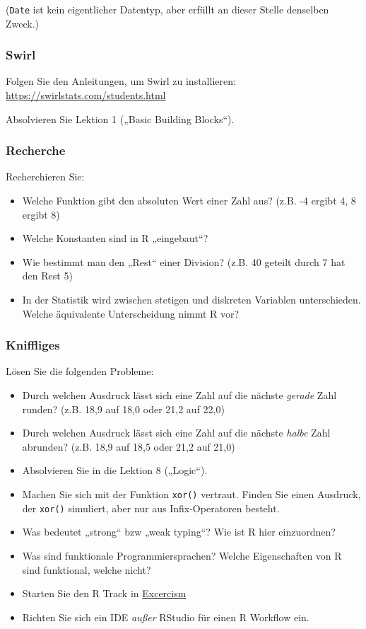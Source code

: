 \documentclass[11pt,german,a4paper]{article}
\providecommand{\tightlist}{%
  \setlength{\itemsep}{0pt}\setlength{\parskip}{0pt}}
\begin{document}
(\texttt{Date} ist kein eigentlicher Datentyp, aber erfüllt an dieser Stelle denselben Zweck.)

\hypertarget{swirl}{%
\subsubsection{Swirl}\label{swirl}}

Folgen Sie den Anleitungen, um Swirl zu installieren: \url{https://swirlstats.com/students.html}

Absolvieren Sie Lektion 1 („Basic Building Blocks``).

\hypertarget{recherche}{%
\subsubsection{Recherche}\label{recherche}}

Recherchieren Sie:

\begin{itemize}
\tightlist
\item
  Welche Funktion gibt den absoluten Wert einer Zahl aus? (z.B. -4 ergibt 4, 8 ergibt 8)
\item
  Welche Konstanten sind in R „eingebaut``?
\item
  Wie bestimmt man den „Rest`` einer Division? (z.B. 40 geteilt durch 7 hat den Rest 5)
\item
  In der Statistik wird zwischen stetigen und diskreten Variablen unterschieden. Welche äquivalente Unterscheidung nimmt R vor?
\end{itemize}

\hypertarget{kniffliges}{%
\subsubsection{Kniffliges}\label{kniffliges}}

Lösen Sie die folgenden Probleme:

\begin{itemize}
\tightlist
\item
  Durch welchen Ausdruck lässt sich eine Zahl auf die nächste \emph{gerade} Zahl runden? (z.B. 18,9 auf 18,0 oder 21,2 auf 22,0)
\item
  Durch welchen Ausdruck lässt sich eine Zahl auf die nächste \emph{halbe} Zahl abrunden? (z.B. 18,9 auf 18,5 oder 21,2 auf 21,0)
\item
  Absolvieren Sie in die Lektion 8 („Logic``).
\item
  Machen Sie sich mit der Funktion \texttt{xor()} vertraut. Finden Sie einen Ausdruck, der \texttt{xor()} simuliert, aber nur aus Infix-Operatoren besteht.
\item
  Was bedeutet „strong`` bzw „weak typing``? Wie ist R hier einzuordnen?
\item
  Was sind funktionale Programmiersprachen? Welche Eigenschaften von R sind funktional, welche nicht?
\item
  Starten Sie den R Track in \href{https://exercism.io/}{Excercism}
\item
  Richten Sie sich ein IDE \emph{außer} RStudio für einen R Workflow ein.
\end{itemize}
\end{document}
